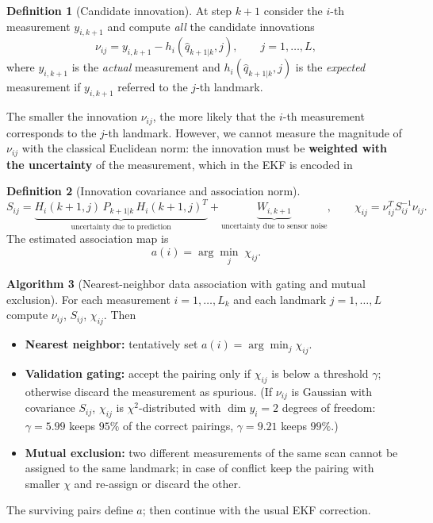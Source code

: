 \documentclass[11pt,a4paper]{article}
\def\bm#1{#1}%
\def\boldsymbol#1{#1}%
\newcommand{\hq}{\hat{\boldsymbol{q}}}
\theoremstyle{definition}
\newtheorem{definition}{Definition}[section]
\newtheorem{algorithm}[definition]{Algorithm}
\theoremstyle{plain}
\theoremstyle{remark}
\begin{document}
\begin{definition}[Candidate innovation]
At step $k+1$ consider the $i$-th measurement $\bm y_{i,k+1}$ and compute \emph{all} the candidate innovations
\[
\bm\nu_{ij}=\bm y_{i,k+1}-\bm h_i(\hq_{k+1|k},j),\qquad j=1,\dots,L,
\]
where $\bm y_{i,k+1}$ is the \emph{actual} measurement and $\bm h_i(\hq_{k+1|k},j)$ is the \emph{expected} measurement if $\bm y_{i,k+1}$ referred to the $j$-th landmark.
\end{definition}

The smaller the innovation $\bm\nu_{ij}$, the more likely that the $i$-th measurement corresponds to the $j$-th landmark. However, we cannot measure the magnitude of $\bm\nu_{ij}$ with the classical Euclidean norm: the innovation must be \textbf{weighted with the uncertainty} of the measurement, which in the EKF is encoded in
\begin{definition}[Innovation covariance and association norm]
\[
\bm S_{ij}=\underbrace{\bm H_i(k+1,j)\,\bm P_{k+1|k}\,\bm H_i(k+1,j)^T}_{\text{uncertainty due to prediction}}+\underbrace{\bm W_{i,k+1}}_{\text{uncertainty due to sensor noise}},
\qquad
\chi_{ij}=\bm\nu_{ij}^T\bm S_{ij}^{-1}\bm\nu_{ij}.
\]
The estimated association map is
\[
a(i)=\arg\min_{j}\;\chi_{ij}.
\]
\end{definition}

\begin{algorithm}[Nearest-neighbor data association with gating and mutual exclusion]
For each measurement $i=1,\dots,L_k$ and each landmark $j=1,\dots,L$ compute $\bm\nu_{ij}$, $\bm S_{ij}$, $\chi_{ij}$. Then
\begin{itemize}
  \item \textbf{Nearest neighbor:} tentatively set $a(i)=\arg\min_j\chi_{ij}$.
  \item \textbf{Validation gating:} accept the pairing only if $\chi_{ij}$ is below a threshold $\gamma$; otherwise discard the measurement as spurious. (If $\bm\nu_{ij}$ is Gaussian with covariance $\bm S_{ij}$, $\chi_{ij}$ is $\chi^2$-distributed with $\dim\bm y_i=2$ degrees of freedom: $\gamma=5.99$ keeps $95\%$ of the correct pairings, $\gamma=9.21$ keeps $99\%$.)
  \item \textbf{Mutual exclusion:} two different measurements of the same scan cannot be assigned to the same landmark; in case of conflict keep the pairing with smaller $\chi$ and re-assign or discard the other.
\end{itemize}
The surviving pairs define $a$; then continue with the usual EKF correction.
\end{algorithm}
\end{document}
